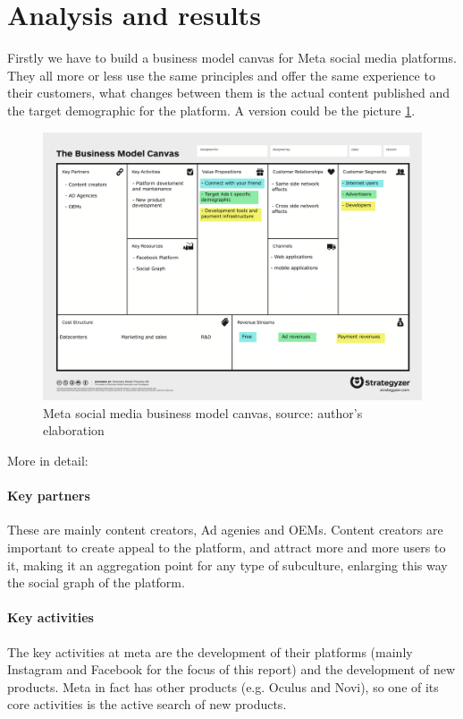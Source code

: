 \section{Analysis and results}\label{sec:analysis}
Firstly we have to build a business model canvas for Meta social media
platforms. They all more or less use the same principles and offer the
same experience to their customers, what changes between them is the
actual content published and the target demographic for the platform.
A version could be the picture \ref{fig:fbcanvas}.

\begin{figure}[ht]
  \centering
  \includegraphics[width=.8\textwidth]{images/fbcanvas.png}
  \caption{Meta social media business model canvas, source: author's
    elaboration}
  \label{fig:fbcanvas}
\end{figure}

More in detail:
\paragraph{Key partners}
These are mainly content creators, Ad agenies and OEMs. Content
creators are important to create appeal to the platform, and attract
more and more users to it, making it an aggregation point for any type
of subculture, enlarging this way the social graph of the platform.

\paragraph{Key activities}
The key activities at meta are the development of their platforms
(mainly Instagram and Facebook for the focus of this report) and the
development of new products. Meta in fact has other products
(e.g. Oculus and Novi), so one of its core activities is the active
search of new products.

